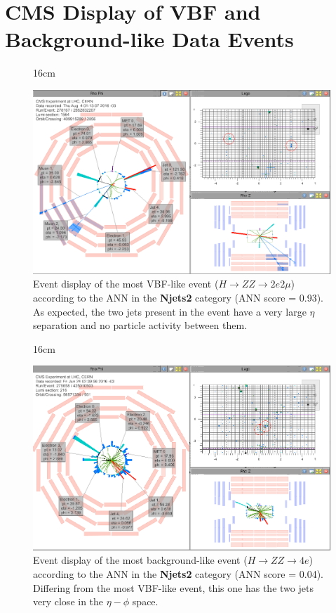\chapter{CMS Display of VBF and Background-like Data Events}
 
\begin{figure}[H!]{16cm}
	\vspace{-20cm}
	\caption{Event display of the most VBF-like event ($H \rightarrow ZZ \rightarrow 2e2\mu$) according to the ANN in the \textbf{Njets2} category (ANN score = 0.93). As expected, the two jets present in the event have a very large $\eta$ separation and no particle activity between them.}
	\includegraphics[scale=0.7,angle=90]{ChapterAnalysis/figs/event_display_Run278167_Lumi1564_Event2852832207_Njets2_ANN0p93_DoubleEG_Run2016F_2}
\end{figure}

\begin{figure}[H!]{16cm}
	\caption{Event display of the most background-like event ($H \rightarrow ZZ \rightarrow 4e$) according to the ANN in the \textbf{Njets2} category (ANN score = 0.04). Differing from the most VBF-like event, this one has the two jets very close in the $\eta-\phi$ space.}
	\includegraphics[scale=0.7,angle=90]{ChapterAnalysis/figs/event_display_Run275658_Lumi216_Event425010503_Njets2_ANN0p15_DoubleEG_Run2016C_2}
\end{figure}

